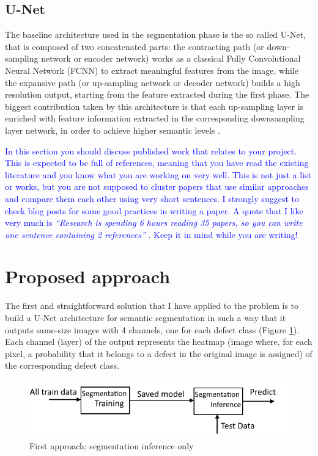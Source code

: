 \documentclass[10pt,twocolumn,letterpaper]{article}
\begin{document}
   \subsection{U-Net}
      The baseline architecture used in the segmentation phase is the so called U-Net, that is composed of two concatenated parts: the contracting path (or down-sampling network or encoder network) works as a classical Fully Convolutional Neural Network (FCNN) to extract meaningful features from the image, while the expansive path (or up-sampling network or decoder network) builds a high resolution output, starting from the feature extracted during the first phase. The biggest contribution taken by this architecture is that each up-sampling layer is enriched with feature information extracted in the corresponding downsampling layer network, in order to achieve higher semantic levels \cite{Unet}. 
   

\textcolor{blue}{
In this section you should discuss published work that relates to your project. This is expected to be full of references, meaning that you have read the existing literature and you know what you are working on very well. This is not just a list or works, but you are not supposed to cluster papers that use similar approaches and compare them each other using very short sentences. I strongly suggest to check \cite{steinhardt, lipton} blog posts for some good practices in writing a paper. A quote that I like very much is \emph{``Research is spending 6 hours reading 35 papers, so you can write one sentence containing 2 references''} \cite{twit:ref}. Keep it in mind while you are writing!
}



\section{Proposed approach}
   The first and straightforward solution that I have applied to the problem is to build a U-Net architecture for semantic segmentation in such a way that it outputs same-size images with 4 channels, one for each defect class (Figure \ref{fig:firstApproach}).  
   Each channel (layer) of the output represents the heatmap (image where, for each pixel, a probability that it belongs to a defect in the original image is assigned) of the corresponding defect class. 

   \begin{figure}[h]
      \centering
      \caption{First approach: segmentation inference only} \label{fig:firstApproach}
      \includegraphics[scale=0.55]{Img_FirstApproach}
   \end{figure}
\end{document}
